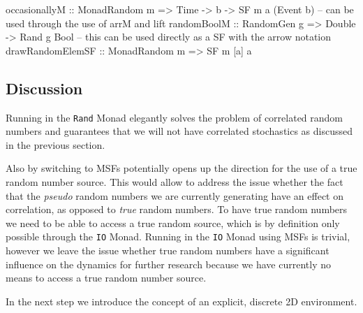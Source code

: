 \begin{HaskellCode}
occasionallyM :: MonadRandom m => Time -> b -> SF m a (Event b)
-- can be used through the use of arrM and lift
randomBoolM :: RandomGen g => Double -> Rand g Bool
-- this can be used directly as a SF with the arrow notation
drawRandomElemSF :: MonadRandom m => SF m [a] a
\end{HaskellCode}

\subsection{Discussion} 
Running in the \texttt{Rand} Monad elegantly solves the problem of correlated random numbers and guarantees that we will not have correlated stochastics as discussed in the previous section. 

Also by switching to MSFs potentially opens up the direction for the use of a true random number source. This would allow to address the issue whether the fact that the \textit{pseudo} random numbers we are currently generating have an effect on correlation, as opposed to \textit{true} random numbers. To have true random numbers we need to be able to access a true random source, which is by definition only possible through the \texttt{IO} Monad. Running in the \texttt{IO} Monad using MSFs is trivial, however we leave the issue whether true random numbers have a significant influence on the dynamics for further research because we have currently no means to access a true random number source.

In the next step we introduce the concept of an explicit, discrete 2D environment.